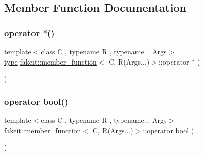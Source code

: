 \subsection{Member Function Documentation}
\mbox{\label{classfakeit_1_1member__function_3_01C_00_01R_07Args_8_8_8_08_4_a81ecf7365097bf973b5496efa6c6e6db}} 
\subsubsection{\texorpdfstring{operator $\ast$()}{operator *()}}
{\footnotesize\ttfamily template$<$class C , typename R , typename... Args$>$ \\
\mbox{\hyperlink{classfakeit_1_1member__function_3_01C_00_01R_07Args_8_8_8_08_4_a21761d9e5d16d880e677d266fc331aaa}{type}} \mbox{\hyperlink{classfakeit_1_1member__function}{fakeit\+::member\+\_\+function}}$<$ C, R(Args...)$>$\+::operator $\ast$ (\begin{DoxyParamCaption}{ }\end{DoxyParamCaption})\hspace{0.3cm}{\ttfamily [inline]}}

\mbox{\label{classfakeit_1_1member__function_3_01C_00_01R_07Args_8_8_8_08_4_a5f3b049a9bd0e8171f86db4fab5f4e5f}} 
\subsubsection{\texorpdfstring{operator bool()}{operator bool()}}
{\footnotesize\ttfamily template$<$class C , typename R , typename... Args$>$ \\
\mbox{\hyperlink{classfakeit_1_1member__function}{fakeit\+::member\+\_\+function}}$<$ C, R(Args...)$>$\+::operator bool (\begin{DoxyParamCaption}{ }\end{DoxyParamCaption})\hspace{0.3cm}{\ttfamily [inline]}}


